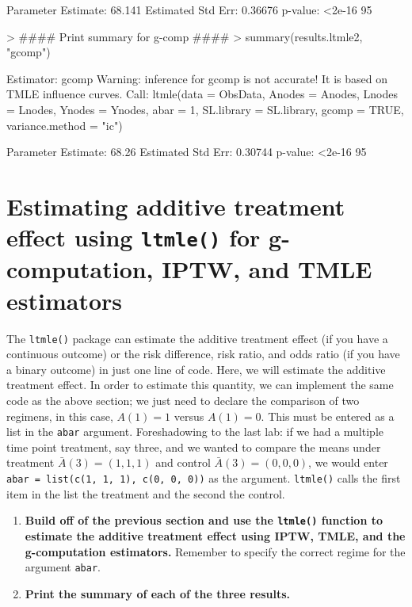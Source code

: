 \documentclass[answers]{exam}
\begin{document}
\begin{solution}
\begin{Schunk}
\begin{Soutput}
   Parameter Estimate:  68.141 
    Estimated Std Err:  0.36676 
              p-value:  <2e-16 
    95%
\end{Soutput}
\end{Schunk}
\begin{Schunk}
\begin{Sinput}
> #### Print summary for g-comp ####
> summary(results.ltmle2, "gcomp")
\end{Sinput}
\begin{Soutput}
Estimator:  gcomp 
Warning: inference for gcomp is not accurate! It is based on TMLE influence curves.
Call:
ltmle(data = ObsData, Anodes = Anodes, Lnodes = Lnodes, Ynodes = Ynodes, 
    abar = 1, SL.library = SL.library, gcomp = TRUE, variance.method = "ic")

   Parameter Estimate:  68.26 
    Estimated Std Err:  0.30744 
              p-value:  <2e-16 
    95%
\end{Soutput}
\end{Schunk}

\end{solution}

\section{Estimating additive treatment effect using \texttt{ltmle()} for g-computation, IPTW, and TMLE estimators}

The \texttt{ltmle()} package can estimate the additive treatment effect (if you have a continuous outcome) or the risk difference, risk ratio, and odds ratio (if you have a binary outcome) in just one line of code. Here, we will estimate the additive treatment effect. In order to estimate this quantity, we can implement the same code as the above section; we just need to declare the comparison of two regimens, in this case, $A(1) = 1$ versus
$A(1) = 0$. This must be entered as a list in the \texttt{abar} argument. Foreshadowing to the last lab: if we had a multiple time point treatment, say three, and we wanted to compare the means under treatment $\bar{A}(3) = (1, 1, 1)$ and control $\bar{A}(3) = (0, 0, 0)$, we would enter \texttt{abar = list(c(1, 1, 1), c(0, 0, 0))} as the argument. \texttt{ltmle()} calls the first item in the list the treatment and the second the control.

\begin{enumerate}
\item \textbf{Build off of the previous section and use the \texttt{ltmle()} function to estimate the additive treatment effect using IPTW, TMLE, and the g-computation estimators.} Remember to specify the correct regime for the argument \texttt{abar}.
\item \textbf{Print the summary of each of the three results.}
\end{enumerate}
\end{document}
